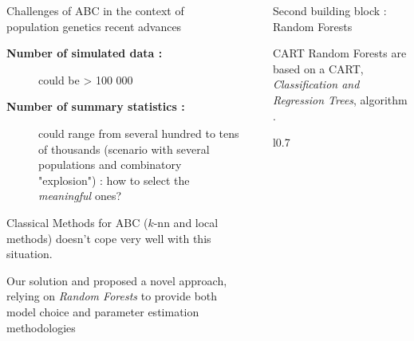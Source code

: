 \documentclass[final]{beamer}
\newlength{\sepwidth}
\newlength{\colwidth}
\newcommand{\separatorcolumn}{\begin{column}{\sepwidth}\end{column}}
\begin{document}
\begin{frame}[t]
\begin{columns}[t]
\begin{column}{\colwidth}
  \begin{alertblock}{Challenges of ABC}
    in the context of population genetics recent advances
    \begin{description}
      \item[\color{darkyellow}\sffamily \textbf{Number of simulated data :}] could be > 100 000
      \item[\color{darkyellow}\sffamily \textbf{Number of summary statistics :}] could range from several hundred to tens of thousands (scenario with several populations and combinatory "explosion") : how to select the \emph{\color{darkred} meaningful} ones?
    \end{description}
    Classical Methods for ABC ($k$-nn and local methods) doesn't cope very well with this situation.
  \end{alertblock}
\begin{block}{Our solution}
  \cite{pudlo2015reliable} and \cite{raynal2016abc} proposed a novel approach, relying on \emph{Random Forests} to provide both model choice and parameter estimation methodologies
\end{block}
\end{column}

\separatorcolumn

\begin{column}{\colwidth}

  \begin{block}{Second building block : Random Forests}
    \begin{block}{CART}
      Random Forests are based on a CART, \emph{Classification and Regression Trees}, algorithm \cite{breiman:etal:1984}.

      \begin{wrapfigure}{l}{0.7\textwidth}
        \begin{center}
\end{center}
\end{wrapfigure}
\end{block}
\end{block}
\end{column}
\end{columns}
\end{frame}
\end{document}
